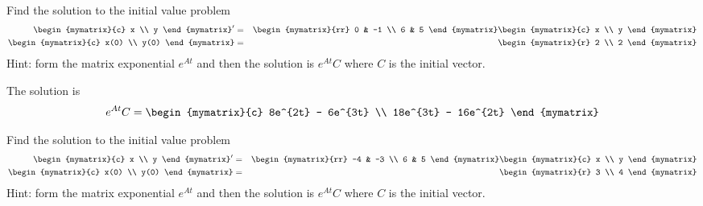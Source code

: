 \begin{enumialphparenastyle}

\begin{ex}
Find the solution to the initial value problem 
\begin{eqnarray*}
\begin{mymatrix}{c}
x \\ 
y 
\end{mymatrix} ^{\prime } &=&\begin{mymatrix}{rr}
0 & -1 \\ 
6 & 5 
\end{mymatrix} \begin{mymatrix}{c}
x \\ 
y 
\end{mymatrix} \\
\begin{mymatrix}{c}
x(0) \\ 
y(0) 
\end{mymatrix} &=&\begin{mymatrix}{r}
2 \\ 
2 
\end{mymatrix}
\end{eqnarray*} 
Hint: form the matrix exponential $e^{At}$ and then the solution is $e^{At}C$ where $C$ is the initial vector. 
\begin{sol}
The solution is 
\[
e^{At}C = \begin{mymatrix}{c}
8e^{2t} - 6e^{3t} \\
18e^{3t} - 16e^{2t}
\end{mymatrix}
\]
\end{sol}
\end{ex}


\begin{ex}
 Find the solution to the initial value problem 
\begin{eqnarray*}
\begin{mymatrix}{c}
x \\ 
y 
\end{mymatrix} ^{\prime } &=&\begin{mymatrix}{rr}
-4 & -3 \\ 
6 & 5 
\end{mymatrix} \begin{mymatrix}{c}
x \\ 
y 
\end{mymatrix} \\
\begin{mymatrix}{c}
x(0) \\ 
y(0) 
\end{mymatrix} &=&\begin{mymatrix}{r}
3 \\ 
4 
\end{mymatrix}
\end{eqnarray*} 
Hint: form the matrix exponential $e^{At}$ and then the solution is $e^{At}C$ where $C$ is the initial vector. 
\end{ex}


\end{enumialphparenastyle}
